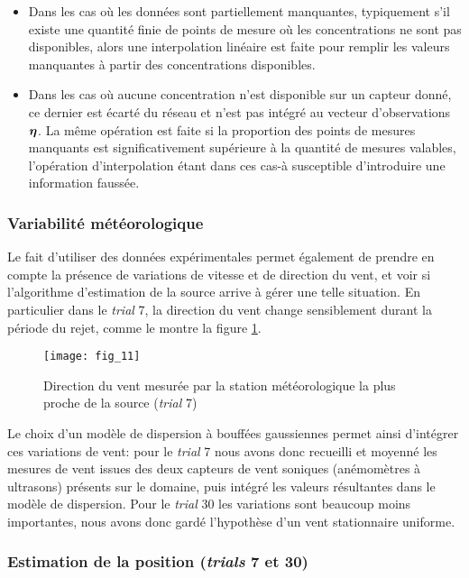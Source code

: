 { \begin{itemize}
 	\item Dans les cas où les données sont partiellement manquantes, typiquement s'il existe une quantité finie de points de mesure où les concentrations ne sont pas disponibles, alors une interpolation linéaire est faite pour remplir les valeurs manquantes à partir des concentrations disponibles.
 	\item Dans les cas où aucune concentration n'est disponible sur un capteur donné, ce dernier est écarté du réseau et n'est pas intégré au vecteur d'observations ${\bm{\eta}}$. La même opération est faite si la proportion des points de mesures manquants est significativement supérieure à la quantité de mesures valables, l'opération d'interpolation étant dans ces cas-à susceptible d'introduire une information faussée.\\
 \end{itemize}
 
\subsubsection{Variabilité météorologique}

Le fait d'utiliser des données expérimentales permet également de prendre en compte la présence de variations de vitesse et de direction du vent, et voir si l'algorithme d'estimation de la source arrive à gérer une telle situation. En particulier dans le \textit{trial} 7, la direction du vent change sensiblement durant la période du rejet, comme le montre la figure \ref{fig_11_AE}.

\begin{figure}[h!]
	\centering
	\texttt{[image: fig\_11]}
	\caption{Direction du vent mesurée par la station météorologique la plus proche de la source (\textit{trial} 7)}
	\label{fig_11_AE}
\end{figure}

Le choix d'un modèle de dispersion à bouffées gaussiennes permet ainsi d'intégrer ces variations de vent: pour le \textit{trial} 7 nous avons donc recueilli et moyenné les mesures de vent issues des deux capteurs de vent soniques (anémomètres à ultrasons) présents sur le domaine, puis intégré les valeurs résultantes dans le modèle de dispersion. \newpage Pour le \textit{trial} 30 les variations sont beaucoup moins importantes, nous avons donc gardé l'hypothèse d'un vent stationnaire uniforme. \\

\subsubsection{Estimation de la position (\textit{trials} 7 et 30)}

}
